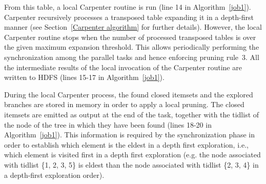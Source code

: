 From this table, a local Carpenter routine is run (line 14 in Algorithm~\ref{job1}). Carpenter recursively processes a transposed
table expanding it in a depth-first manner (see Section~\ref{Carpenter algorithm} for further details). 
However, the local Carpenter routine stops when the number of processed transposed tables is over the given maximum
expansion threshold. This allows periodically performing the synchronization among the parallel tasks and
hence enforcing pruning rule~3.
All the intermediate results of the local invocation of the Carpenter routine are written to HDFS (lines 15-17 in Algorithm~\ref{job1}).

During the local Carpenter process, the found closed itemsets and the explored
branches are
 stored in memory in order to apply a local pruning. The closed itemsets are
emitted as output at the end of the task, together with the tidlist of the node
of the tree in
which they have been found (lines 18-20 in Algorithm~\ref{job1}). This information is required by the synchronization
phase in order to establish which element is the eldest in a depth first
exploration, i.e., which element is visited  first in a depth first
exploration (e.g. the node associated with tidlist \{1, 2,
3, 5\} is eldest than the node associated with tidlist \{2, 3, 4\} in a depth-first exploration order).\\

